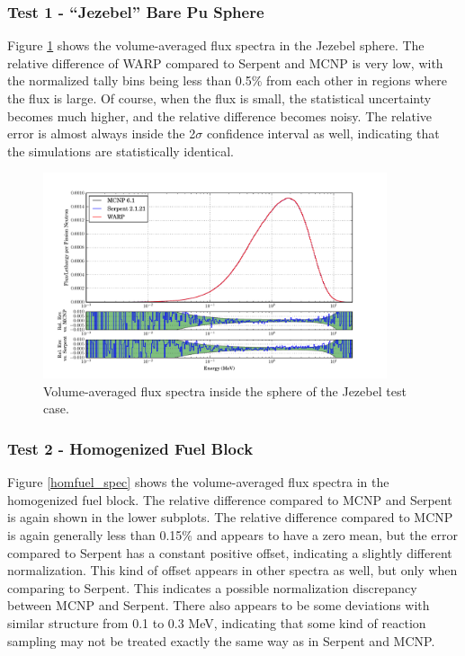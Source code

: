 \documentclass[preprint,12pt]{elsarticle}
\begin{document}
\newpage
\subsubsection{Test 1 - ``Jezebel'' Bare Pu Sphere}

Figure \ref{jezebel_spec} shows the volume-averaged flux spectra in the Jezebel sphere.  The relative difference of WARP compared to Serpent and MCNP is very low, with the normalized tally bins being less than 0.5\% from each other in regions where the flux is large.  Of course, when the flux is small, the statistical uncertainty becomes much higher, and the relative difference becomes noisy.   The relative error is almost always inside the 2$\sigma$ confidence interval as well, indicating that the simulations are statistically identical. 

\begin{figure}[h!]
\centering
\includegraphics[width=0.9\textwidth,trim= 1cm 0cm 1cm 0cm]{graphics/jezebel_spec.pdf}
\caption{Volume-averaged flux spectra inside the sphere of the Jezebel test case. \label{jezebel_spec} }
\end{figure}

\newpage
\subsubsection{Test 2 - Homogenized Fuel Block}

Figure \ref{homfuel_spec} shows the volume-averaged flux spectra in the homogenized fuel block.  The relative difference compared to MCNP and Serpent is again shown in the lower subplots.  The relative difference compared to MCNP is again generally less than 0.15\% and appears to have a zero mean, but the error compared to Serpent has a constant positive offset, indicating a slightly different normalization.  This kind of offset appears in other spectra as well, but only when comparing to Serpent.  This indicates a possible normalization discrepancy between MCNP and Serpent.  There also appears to be some  deviations with similar structure from 0.1 to 0.3 MeV, indicating that some kind of reaction sampling may not be treated exactly the same way as in Serpent and MCNP.
\end{document}
